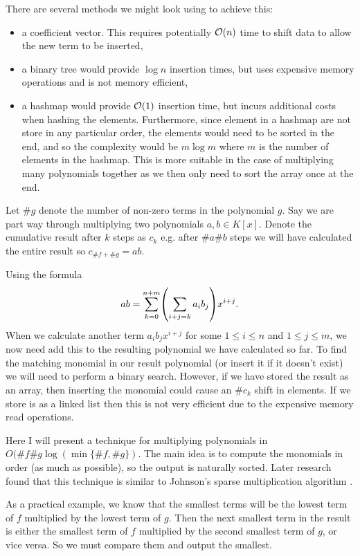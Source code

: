 There are several methods we might look using to achieve this:
\begin{itemize}
    \item a coefficient vector. This requires potentially $\mathcal O(n)$ time to shift data to allow the new term to be inserted,
    \item a binary tree would provide $\log n$ insertion times, but uses expensive memory operations and is not memory efficient, 
    \item a hashmap would provide $\mathcal O(1)$ insertion time, but incurs additional costs when hashing the elements. Furthermore, since element in a hashmap are not store in any particular order, the elements would need to be sorted in the end, and so the complexity would be $m \log m$ where $m$ is the number of elements in the hashmap. This is more suitable in the case of multiplying many polynomials together as we then only need to sort the array once at the end.
\end{itemize}

Let $\# g$ denote the number of non-zero terms in the polynomial $g$. Say we are part way through multiplying two polynomials $a, b \in K[x]$. Denote the cumulative result after $k$ steps as $c_k$ e.g. after $\# a \# b$ steps we will have calculated the entire result so $c_{\#f + \#g} = ab$.

Using the formula
\[
    ab = \sum^{n + m}_{k=0} \bb{\sum_{i + j = k}a_ib_j} x^{i + j}.
\]
When we calculate another term $a_ib_j x^{i + j}$ for some $1 \le i \le n$ and $1 \le j \le m$, we now need add this to the resulting polynomial we have calculated so far. To find the matching monomial in our result polynomial (or insert it if it doesn't exist) we will need to perform a binary search. However, if we have stored the result as an array, then inserting the monomial could cause an $\#c_k$ shift in elements. If we store is as a linked list then this is not very efficient due to the expensive memory read operations.

Here I will present a technique for multiplying polynomials in $O(\# f \# g \log (\min\{\# f, \# g\})$. The main idea is to compute the monomials in order (as much as possible), so the output is naturally sorted. Later research found that this technique is similar to Johnson's sparse multiplication algorithm \cite{johnson-sparse-polynomial}.

As a practical example, we know that the smallest terms will be the lowest term of $f$ multiplied by the lowest term of $g$. Then the next smallest term in the result is either the smallest term of $f$ multiplied by the second smallest term of $g$, or vice versa. So we must compare them and output the smallest.

